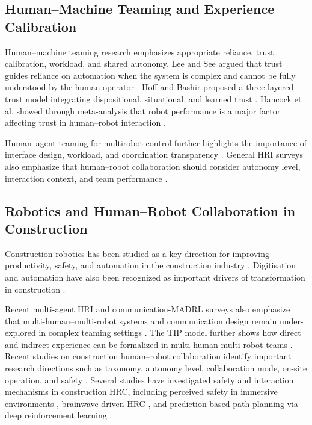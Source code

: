 \documentclass[fleqn,10pt]{wlpeerj}
\begin{document}
\subsection{Human--Machine Teaming and Experience Calibration}

Human--machine teaming research emphasizes appropriate reliance, trust calibration, workload, and shared autonomy. Lee and See argued that trust guides reliance on automation when the system is complex and cannot be fully understood by the human operator \cite{LeeSee2004Trust}. Hoff and Bashir proposed a three-layered trust model integrating dispositional, situational, and learned trust \cite{HoffBashir2015Trust}. Hancock et al. showed through meta-analysis that robot performance is a major factor affecting trust in human--robot interaction \cite{Hancock2011TrustHRI}.

Human--agent teaming for multirobot control further highlights the importance of interface design, workload, and coordination transparency \cite{ChenBarnes2014HumanAgentTeaming}. General HRI surveys also emphasize that human--robot collaboration should consider autonomy level, interaction context, and team performance \cite{GoodrichSchultz2007HRI,Parasuraman2000LevelsAutomation}.

\subsection{Robotics and Human--Robot Collaboration in Construction}

Construction robotics has been studied as a key direction for improving productivity, safety, and automation in the construction industry \cite{Bock2015FutureConstructionAutomation,BockLinner2016ConstructionRobots}. Digitisation and automation have also been recognized as important drivers of transformation in construction \cite{OesterreichTeuteberg2016DigitisationConstruction}.

Recent multi-agent HRI and communication-MADRL surveys also emphasize that multi-human--multi-robot systems and communication design remain under-explored in complex teaming settings \cite{Dahiya2022MultiAgentHRI,Zhu2024CommMADRL}. The TIP model further shows how direct and indirect experience can be formalized in multi-human multi-robot teams \cite{Guo2024TIP}. Recent studies on construction human--robot collaboration identify important research directions such as taxonomy, autonomy level, collaboration mode, on-site operation, and safety \cite{Liang2021HRCConstruction,Zhang2023HRCOnSite,Rodrigues2023HRITaxonomy}. Several studies have investigated safety and interaction mechanisms in construction HRC, including perceived safety in immersive environments \cite{You2018PerceivedSafety}, brainwave-driven HRC \cite{Liu2021BrainwaveHRC}, and prediction-based path planning via deep reinforcement learning \cite{Cai2023PredictionPathPlanning}.
\end{document}
